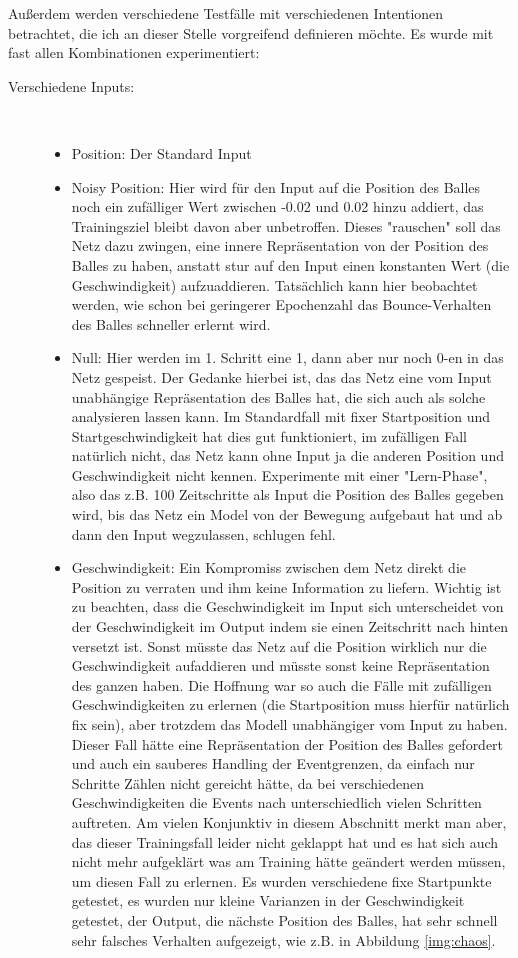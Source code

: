 Außerdem werden verschiedene Testfälle mit verschiedenen Intentionen betrachtet, die ich an dieser Stelle vorgreifend definieren möchte. Es wurde mit fast allen Kombinationen experimentiert:
\begin{description}
	\item[Verschiedene Inputs:] \hfill \\
	\begin{itemize}
		\item Position: Der Standard Input
		\item Noisy Position: Hier wird für den Input auf die Position des Balles noch ein zufälliger Wert zwischen -0.02 und 0.02 hinzu addiert, das Trainingsziel bleibt davon aber unbetroffen. Dieses "rauschen" soll das Netz dazu zwingen, eine innere Repräsentation von der Position des Balles zu haben, anstatt stur auf den Input einen konstanten Wert (die Geschwindigkeit) aufzuaddieren. Tatsächlich kann hier beobachtet werden, wie schon bei geringerer Epochenzahl das Bounce-Verhalten des Balles schneller erlernt wird.
		\item Null: Hier werden im 1. Schritt eine 1, dann aber nur noch 0-en in das Netz gespeist. Der Gedanke hierbei ist, das das Netz eine vom Input unabhängige Repräsentation des Balles hat, die sich auch als solche analysieren lassen kann. Im Standardfall mit fixer Startposition und Startgeschwindigkeit hat dies gut funktioniert, im zufälligen Fall natürlich nicht, das Netz kann ohne Input ja die anderen Position und Geschwindigkeit nicht kennen. Experimente mit einer "Lern-Phase", also das z.B. 100 Zeitschritte als Input die Position des Balles gegeben wird, bis das Netz ein Model von der Bewegung aufgebaut hat und ab dann den Input wegzulassen, schlugen fehl. 
		\item Geschwindigkeit: Ein Kompromiss zwischen dem Netz direkt die Position zu verraten und ihm keine Information zu liefern. Wichtig ist zu beachten, dass die Geschwindigkeit im Input sich unterscheidet von der Geschwindigkeit im Output indem sie einen Zeitschritt nach hinten versetzt ist. Sonst müsste das Netz auf die Position wirklich nur die Geschwindigkeit aufaddieren und müsste sonst keine Repräsentation des ganzen haben. Die Hoffnung war so auch die Fälle mit zufälligen Geschwindigkeiten zu erlernen (die Startposition muss hierfür natürlich fix sein), aber trotzdem das Modell unabhängiger vom Input zu haben. Dieser Fall hätte eine Repräsentation der Position des Balles gefordert und auch ein sauberes Handling der Eventgrenzen, da einfach nur Schritte Zählen nicht gereicht hätte, da bei verschiedenen Geschwindigkeiten die Events nach unterschiedlich vielen Schritten auftreten. Am vielen Konjunktiv in diesem Abschnitt merkt man aber, das dieser Trainingsfall leider nicht geklappt hat und es hat sich auch nicht mehr aufgeklärt was am Training hätte geändert werden müssen, um diesen Fall zu erlernen. Es wurden verschiedene fixe Startpunkte getestet, es wurden nur kleine Varianzen in der Geschwindigkeit getestet, der Output, die nächste Position des Balles, hat sehr schnell sehr falsches Verhalten aufgezeigt, wie z.B. in Abbildung \ref{img:chaos}.
	\end{itemize}


\end{description}
